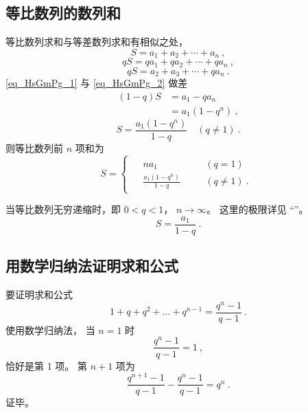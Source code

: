 \subsection{等比数列的数列和}
等比数列求和与等差数列求和有相似之处，
\begin{equation}\label{eq_HsGmPg_1}
S = a_1 + a_2 + \cdots + a_n~,
\end{equation}
\begin{equation}
qS = qa_1 + qa_2 + \cdots + qa_n~,
\end{equation}
\begin{equation}\label{eq_HsGmPg_2}
qS= a_2 + a_3 + \cdots + qa_n~.
\end{equation}
\autoref{eq_HsGmPg_1} 与 \autoref{eq_HsGmPg_2} 做差
\begin{equation}
\begin{aligned}
(1 - q)S &= a_1 - qa_n\\
&= a_1(1 - q^n)~,
\end{aligned}
\end{equation}
\begin{equation}
S = \frac{a_1(1-q^n)}{1-q} \quad (q\neq 1)~.
\end{equation}
则等比数列前 $n$ 项和为
\begin{equation}
S = 
\begin{cases}
\begin{aligned}
&na_1 &\quad &(q = 1) \\
&\frac{a_1(1-q^n)}{1-q} &\quad &(q \neq 1)~.
\end{aligned}
\end{cases}
\end{equation}

当等比数列无穷递缩时，即 $0<q<1$， $n\rightarrow \infty$。 这里的极限详见 “”。
\begin{equation}
S = \frac{a_1}{1 - q}~.
\end{equation}

\subsection{用数学归纳法证明求和公式}
要证明求和公式
\begin{equation}
1 + q + q^2 + \dots + q^{n-1} = \frac{q^n - 1}{q - 1}~.
\end{equation}
使用数学归纳法， 当 $n = 1$ 时
\begin{equation}
\frac{q^n - 1}{q - 1} = 1~,
\end{equation}
恰好是第 1 项。 第 $n + 1$ 项为
\begin{equation}
\frac{q^{n+1} - 1}{q - 1} - \frac{q^n - 1}{q - 1} = q^n~.
\end{equation}
证毕。
